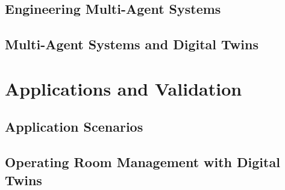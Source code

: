\documentclass[12pt,a4paper,openright,twoside]{book}
\begin{document}
\chapter{Engineering Multi-Agent Systems}
\label{chap:mas-engineering}

\chapter{Multi-Agent Systems and Digital Twins}
\label{chap:mas-dt}

\part{Applications and Validation}

\chapter{Application Scenarios}
\label{chap:application-scenarios}

\chapter{Operating Room Management with Digital Twins}
\label{chap:operating-room-management-digital-twins}





\backmatter



\end{document}
